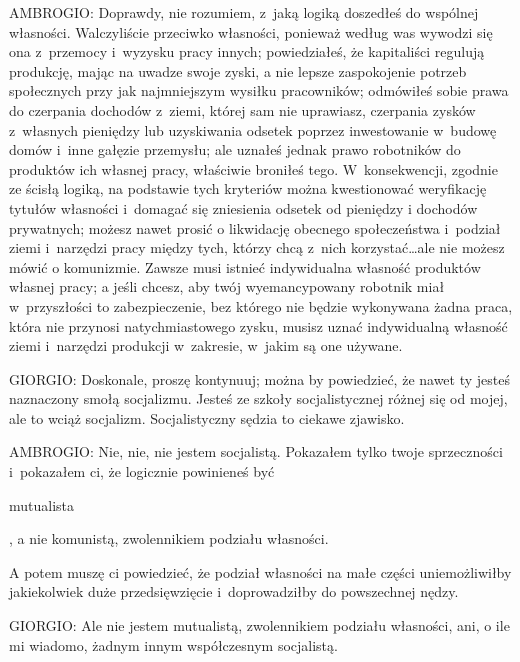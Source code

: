\documentclass[oneside,polish,11pt,sfheadings]{mwbk}
\begin{document}
 
\noindent AMBROGIO: Doprawdy, nie rozumiem, z~jaką logiką doszedłeś do wspólnej własności. Walczyliście przeciwko własności,
ponieważ według was wywodzi się ona z~przemocy i~wyzysku pracy innych; powiedziałeś, że kapitaliści regulują produkcję,
mając na uwadze swoje zyski, a nie lepsze zaspokojenie potrzeb społecznych przy jak najmniejszym wysiłku pracowników;
odmówiłeś sobie prawa do czerpania dochodów z~ziemi, której sam nie uprawiasz, czerpania zysków z~własnych pieniędzy
lub uzyskiwania odsetek poprzez inwestowanie w~budowę domów i~inne gałęzie przemysłu; ale uznałeś jednak prawo
robotników do produktów ich własnej pracy, właściwie broniłeś tego. W~konsekwencji, zgodnie ze ścisłą logiką, na
podstawie tych kryteriów można kwestionować weryfikację tytułów własności i~domagać się zniesienia odsetek od pieniędzy
i dochodów prywatnych; możesz nawet prosić o likwidację obecnego społeczeństwa i~podział ziemi i~narzędzi pracy między
tych, którzy chcą z~nich korzystać\ldots ale nie możesz mówić o komunizmie. Zawsze musi istnieć indywidualna własność
produktów własnej pracy; a jeśli chcesz, aby twój wyemancypowany robotnik miał w~przyszłości to zabezpieczenie, bez
którego nie będzie wykonywana żadna praca, która nie przynosi natychmiastowego zysku, musisz uznać indywidualną
własność ziemi i~narzędzi produkcji w~zakresie, w~jakim są one używane. 




 
\noindent GIORGIO: Doskonale, proszę kontynuuj; można by powiedzieć, że nawet ty jesteś naznaczony smołą socjalizmu. Jesteś ze
szkoły socjalistycznej różnej się od mojej, ale to wciąż socjalizm. Socjalistyczny sędzia to ciekawe zjawisko. 




 
\noindent AMBROGIO: Nie, nie, nie jestem socjalistą. Pokazałem tylko twoje sprzeczności i~pokazałem ci, że logicznie powinieneś
być \begin{itshape}mutualista \end{itshape}, a nie komunistą, zwolennikiem podziału
własności. 

 
A potem muszę ci powiedzieć, że podział własności na małe części uniemożliwiłby jakiekolwiek duże przedsięwzięcie i~doprowadziłby do powszechnej nędzy. 




 
\noindent GIORGIO: Ale nie jestem mutualistą, zwolennikiem podziału własności, ani, o ile mi wiadomo, żadnym innym współczesnym
socjalistą. 
\end{document}

